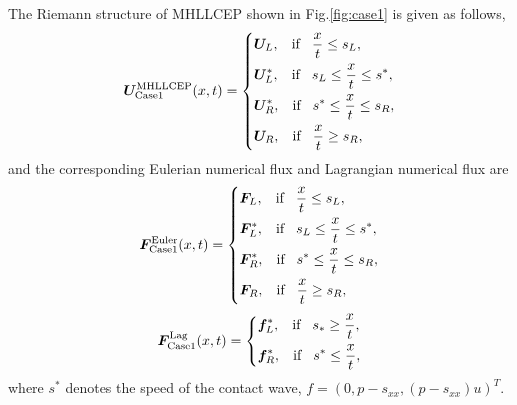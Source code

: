\documentclass{article}
\numberwithin{equation}{section}
\numberwithin{table}{section}
\begin{document}
The Riemann structure of MHLLCEP  shown in Fig.\ref{fig:case1} is given as follows,
\begin{equation}\label{eq:HLLCEP}
  \bm{U}^{\text{MHLLCEP}}_{\text{Case1}}(x,t) = \left\{ \begin{aligned}
		& \bm{U}_L, \hspace{0.3cm} \text{if} \hspace{0.3cm} \frac{x}{t}\le s_L, \\
		& \bm{U}_L^*, \hspace{0.3cm} \text{if} \hspace{0.3cm} s_L\le \frac{x}{t} \le s^*, \\
		& \bm{U}_R^*, \hspace{0.3cm} \text{if} \hspace{0.3cm} s^*\le \frac{x}{t} \le s_R,\\
		& \bm{U}_R, \hspace{0.3cm} \text{if} \hspace{0.3cm} \frac{x}{t}\ge s_R, \\
	  \end{aligned}
	\right.
  \end{equation}
  and the corresponding Eulerian numerical flux and Lagrangian numerical flux are
 \begin{equation}
	\bm{F}^{\text{Euler}}_{\text{Case1}}(x,t) = \left\{ \begin{aligned}
		& \bm{F}_L, \hspace{0.3cm} \text{if} \hspace{0.3cm} \frac{x}{t}\le s_L, \\
		& \bm{F}_L^*, \hspace{0.3cm} \text{if} \hspace{0.3cm} s_L\le \frac{x}{t} \le s^*, \\
		& \bm{F}_R^*, \hspace{0.3cm} \text{if} \hspace{0.3cm} s^*\le \frac{x}{t} \le s_R,\\
		& \bm{F}_R, \hspace{0.3cm} \text{if} \hspace{0.3cm} \frac{x}{t}\ge s_R, \\
	  \end{aligned}
	\right.
  \end{equation}
\begin{equation}
	\bm{F}^{\text{Lag}}_{\text{Case1}}(x,t) = \left\{ \begin{aligned}
		& \bm{f}_L^*, \hspace{0.3cm} \text{if} \hspace{0.3cm} s_*\ge \frac{x}{t},\\
		& \bm{f}_R^*, \hspace{0.3cm} \text{if} \hspace{0.3cm} s^*\le \frac{x}{t},\\
	  \end{aligned}
	\right.
  \end{equation}
where $s^*$ denotes the speed of the contact wave, $f=(0,p-s_{xx},(p-s_{xx})u)^{T}$.
\end{document}
